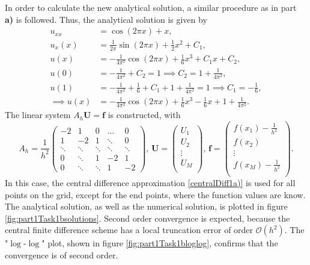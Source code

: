 \noindent In order to calculate the new analytical solution, a similar procedure as in part \textbf{a)} is followed. Thus, the analytical solution is given by 
\begin{equation*}
\begin{split}
    u_{xx} &= \cos{(2\pi x)} + x, \\
    u_x(x) &= \frac{1}{2\pi}\sin{(2\pi x)} + \frac12x^2 + C_1, \\
    u(x) &= -\frac{1}{4\pi^2}\cos{(2\pi x)} + \frac16x^3 + C_1x + C_2, \\
    u(0) &= -\frac{1}{4\pi^2} + C_2 = 1 \implies C_2 = 1+\frac{1}{4\pi^2}, \\
    u(1) &= -\frac{1}{4\pi^2} + \frac16 + C_1 + 1 + \frac{1}{4\pi^2} = 1 \implies C_1 = -\frac16, \\
    \implies u(x) &= -\frac{1}{4\pi^2}\cos{(2\pi x)} + \frac16x^3 -\frac16x + 1 + \frac{1}{4\pi^2}.
\end{split}
\end{equation*}
The linear system $A_h\boldsymbol{U} = \boldsymbol{f}$ is constructed, with 
\begin{equation*}
    A_h = \frac{1}{h^2}\begin{pmatrix} 
    -2 & 1 & 0 & \dots & 0 \\
    1 & -2 & 1 & \ddots & 0 \\
    \ddots & \ddots & \ddots & \ddots & \ddots \\
    0 & \ddots & 1 & -2 & 1 \\
    0 & \ddots & \ddots & 1 & -2
    \end{pmatrix}, \, 
    \boldsymbol{U} = \begin{pmatrix}
    U_1 \\
    U_2 \\
    \vdots \\
    U_M \\
    \end{pmatrix}, \, \boldsymbol{f} = \begin{pmatrix}
    f(x_1) - \frac{1}{h^2} \\
    f(x_2) \\
    \vdots \\
    f(x_M) - \frac{1}{h^2}\\
    \end{pmatrix}.
\end{equation*}
In this case, the central difference approximation \eqref{centralDiff1a)} is used for all points on the grid, except for the end points, where the function values are know. The analytical solution, as well as the numerical solution, is plotted in figure \ref{fig:part1Task1bsolutions}. Second order convergence is expected, because the central finite difference scheme has a local truncation error of order $\mathcal{O}(h^2)$. The "$\log$-$\log$" plot, shown in figure \ref{fig:part1Task1bloglog}, confirms that the convergence is of second order. 

